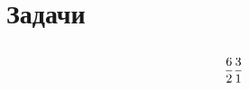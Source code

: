 \documentclass{article}
\begin{document}
 
\section*{Задачи} 
\subsection{}$$\frac{6}{2} \\ \frac{3}{1}$$
 
\end{document}
